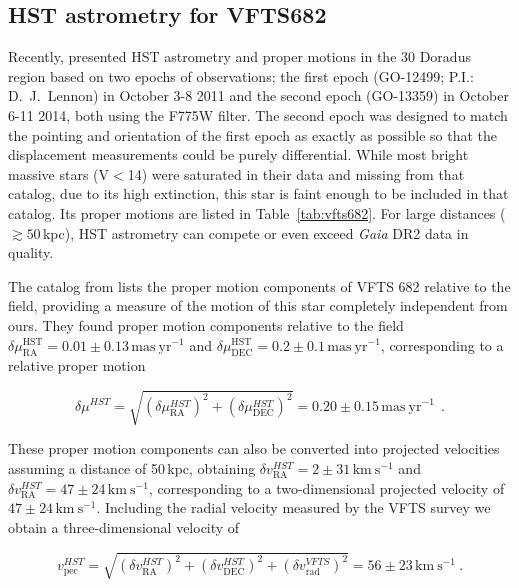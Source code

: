 \documentclass[apjl,twocolumn]{emulateapj}
\newcommand{\kms}{{\,\mathrm{km\ s^{-1}}}}
\DeclareRobustCommand{\Tabref}[1]{Table~\ref{#1}}
\begin{document}
\subsection{HST astrometry for VFTS682}
Recently, \citet{platais:18} presented HST  astrometry and proper
motions in the 30 Doradus region based on two epochs of
observations; the first epoch (GO-12499; P.I.: D.~J.~Lennon)
in October 3-8 2011 and the second epoch (GO-13359) in
October 6-11 2014, both using the F775W filter.
The second epoch was designed to match the pointing and
orientation of the first epoch as exactly as possible so
that the displacement measurements could be purely differential.
While most bright massive stars (V$<$14) were saturated in
their data and missing from that catalog, due to its
high extinction, this star is faint enough
to be included in that catalog. Its proper motions are
listed in \Tabref{tab:vfts682}. For
large distances ($\gtrsim50$\,kpc), HST astrometry can compete or even
exceed \emph{Gaia} DR2 data in quality.

The catalog from \citet{platais:18} lists the proper motion
components of VFTS 682 relative to the field, providing a
measure of the motion of this star completely independent from
ours. They found proper
motion components relative to the field
$\delta\mu_\mathrm{RA}^\mathrm{HST} = 0.01\pm0.13\,\mathrm{mas\
  yr^{-1}}$ and
$\delta\mu_\mathrm{DEC}^\mathrm{HST}=0.2\pm0.1\,\mathrm{mas\
  yr^{-1}}$, corresponding to a relative proper motion 

\begin{equation}
  \label{eq:pm_around_HST}
  \delta \mu^{HST} = \sqrt{\left(\delta\mu_\mathrm{RA}^{HST}\right)^2+\left(\delta\mu_\mathrm{DEC}^{HST}\right)^2}
  = 0.20 \pm 0.15\,\mathrm{mas\
  yr^{-1}} \ \ .
\end{equation}

These proper motion components can also be converted into projected
velocities assuming a distance of 50\,kpc, obtaining $\delta
v_\mathrm{RA}^{HST}=2\pm31\kms$ and $\delta
v_\mathrm{RA}^{HST}=47\pm24\kms$, corresponding to a two-dimensional
projected velocity of $47\pm24\kms$. Including the radial velocity
measured by the VFTS survey we obtain a three-dimensional velocity of

\begin{equation}
  \label{eq:speed_around_HST}
  v_\mathrm{pec}^{HST} = \sqrt{\left(\delta v_\mathrm{RA}^{HST}\right)^2
    +\left(\delta v_\mathrm{DEC}^{HST}\right)^2+\left(\delta
      v_\mathrm{rad}^{VFTS}\right)^2} = 56 \pm 23
  \kms \ .
\end{equation}
\end{document}
